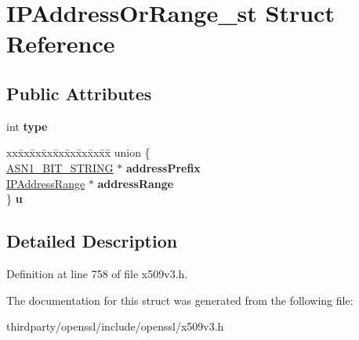\hypertarget{struct_i_p_address_or_range__st}{}\section{I\+P\+Address\+Or\+Range\+\_\+st Struct Reference}
\label{struct_i_p_address_or_range__st}
\subsection*{Public Attributes}
\begin{DoxyCompactItemize}
\item 
\mbox{\label{struct_i_p_address_or_range__st_aa9221b14bda47976f0591fe65a3d90aa}} 
int {\bfseries type}
\item 
\mbox{\label{struct_i_p_address_or_range__st_a4a5dc1856b4c45976a0a07f190155d4c}} 
\begin{tabbing}
xx\=xx\=xx\=xx\=xx\=xx\=xx\=xx\=xx\=\kill
union \{\\
\>\hyperlink{structasn1__string__st}{ASN1\_BIT\_STRING} $\ast$ {\bfseries addressPrefix}\\
\>\hyperlink{struct_i_p_address_range__st}{IPAddressRange} $\ast$ {\bfseries addressRange}\\
\} {\bfseries u}\\

\end{tabbing}\end{DoxyCompactItemize}


\subsection{Detailed Description}


Definition at line 758 of file x509v3.\+h.



The documentation for this struct was generated from the following file\+:\begin{DoxyCompactItemize}
\item 
thirdparty/openssl/include/openssl/x509v3.\+h\end{DoxyCompactItemize}

